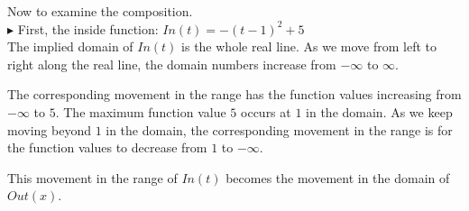 \documentclass{ximera}
\begin{document}
\begin{image}
\end{image}





Now to examine the composition. \\



\textbf{\textcolor{blue!75!black}{$\blacktriangleright$}}   First, the inside function: $In(t) = -(t-1)^2 + 5$ \\

The implied domain of $In(t)$ is the whole real line. As we move from left to right along the real line, the domain numbers increase from $-\infty$ to $\infty$.

The corresponding movement in the range has the function values increasing from $-\infty$ to $5$.  The maximum function value $5$ occurs at $1$ in the domain.  As we keep moving beyond $1$ in the domain, the corresponding movement in the range is for the function values to decrease from $1$ to $-\infty$.


This movement in the range of $In(t)$ becomes the movement in the domain of $Out(x)$. \\
\end{document}
